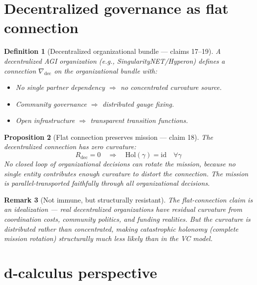 \documentclass[11pt,a4paper]{article}
\newtheorem{definition}{Definition}[section]
\newtheorem{proposition}[definition]{Proposition}
\newtheorem{remark}[definition]{Remark}
\begin{document}
\section{Decentralized governance as flat connection}
\label{sec:decentralized}

\begin{definition}[Decentralized organizational bundle --- claims 17--19]
\label{def:decentral}
A decentralized AGI organization (e.g., SingularityNET/Hyperon) defines
a connection $\nabla_{\text{dec}}$ on the organizational bundle with:
\begin{itemize}
\item No single partner dependency $\Rightarrow$ no concentrated
  curvature source.
\item Community governance $\Rightarrow$ distributed gauge fixing.
\item Open infrastructure $\Rightarrow$ transparent transition functions.
\end{itemize}
\end{definition}

\begin{proposition}[Flat connection preserves mission --- claim 18]
\label{prop:flat}
The decentralized connection has zero curvature:
\[
  R_{\text{dec}} = 0 \quad \Rightarrow \quad
  \mathrm{Hol}(\gamma) = \mathrm{id} \quad \forall \gamma
\]
No closed loop of organizational decisions can rotate the mission,
because no single entity contributes enough curvature to distort the
connection. The mission is parallel-transported faithfully through
all organizational decisions.
\end{proposition}

\begin{remark}[Not immune, but structurally resistant]
The flat-connection claim is an idealization --- real decentralized
organizations have residual curvature from coordination costs, community
politics, and funding realities. But the curvature is distributed rather
than concentrated, making catastrophic holonomy (complete mission
rotation) structurally much less likely than in the VC model.
\end{remark}

\section{d-calculus perspective}
\label{sec:d-calc}
\end{document}
